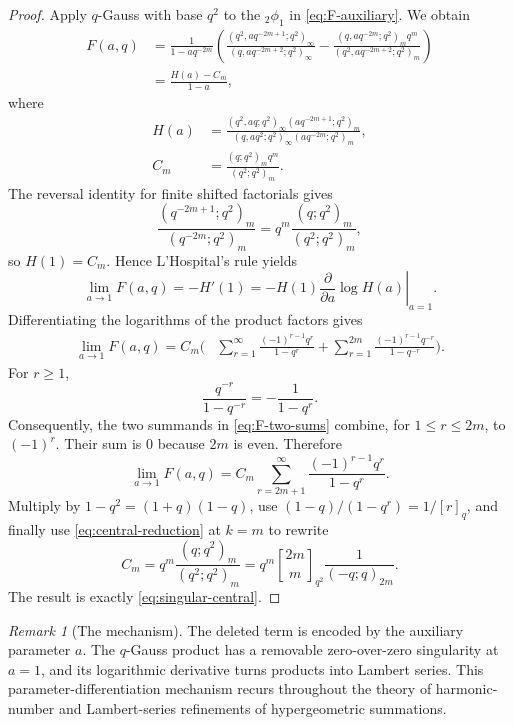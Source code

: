 \documentclass[11pt,oneside,openany]{book}
\theoremstyle{definition}
\theoremstyle{remark}
\newtheorem{remark}[remark]{Remark}
\newcommand{\Qbinom}[3]{\genfrac{[}{]}{0pt}{}{#1}{#2}_{#3}}
\begin{document}
\begin{proof}
Apply $q$-Gauss with base $q^2$ to the ${}_2\phi_1$ in \eqref{eq:F-auxiliary}.  We obtain
\begin{align*}
 F(a,q)
 &=\frac1{1-aq^{-2m}}
 \left(
 \frac{(q^2,aq^{-2m+1};q^2)_\infty}
 {(q,aq^{-2m+2};q^2)_\infty}
 -\frac{(q,aq^{-2m};q^2)_m q^m}
 {(q^2,aq^{-2m+2};q^2)_m}
 \right)\\
 &=\frac{H(a)-C_m}{1-a},
 \tag{18.10}\label{eq:F-H}
\end{align*}
where
\begin{align*}
 H(a)&=
 \frac{(q^2,aq;q^2)_\infty(aq^{-2m+1};q^2)_m}
 {(q,aq^2;q^2)_\infty(aq^{-2m};q^2)_m},\\
 C_m&=\frac{(q;q^2)_m q^m}{(q^2;q^2)_m}.
\end{align*}
The reversal identity for finite shifted factorials gives
\[
 \frac{(q^{-2m+1};q^2)_m}{(q^{-2m};q^2)_m}
 =q^m\frac{(q;q^2)_m}{(q^2;q^2)_m},
\]
so $H(1)=C_m$.  Hence L'Hospital's rule yields
\[
 \lim_{a\to1}F(a,q)=-H'(1)
 =-H(1)\left.\frac{\partial}{\partial a}\log H(a)\right|_{a=1}.
 \tag{18.11}\label{eq:F-logderivative}
\]
Differentiating the logarithms of the product factors gives
\begin{align*}
 \lim_{a\to1}F(a,q)
 =C_m\biggl(&
 \sum_{r=1}^{\infty}
 \frac{(-1)^{r-1}q^r}{1-q^r}
 +\sum_{r=1}^{2m}
 \frac{(-1)^{r-1}q^{-r}}{1-q^{-r}}
 \biggr).
 \tag{18.12}\label{eq:F-two-sums}
\end{align*}
For $r\ge1$,
\[
 \frac{q^{-r}}{1-q^{-r}}=-\frac1{1-q^r}.
\]
Consequently, the two summands in \eqref{eq:F-two-sums} combine, for $1\le r\le2m$, to $(-1)^r$.  Their sum is $0$ because $2m$ is even.  Therefore
\[
 \lim_{a\to1}F(a,q)
 =C_m\sum_{r=2m+1}^{\infty}
 \frac{(-1)^{r-1}q^r}{1-q^r}.
 \tag{18.13}\label{eq:F-tail}
\]
Multiply by $1-q^2=(1+q)(1-q)$, use
$(1-q)/(1-q^r)=1/[r]_q$, and finally use \eqref{eq:central-reduction} at $k=m$ to rewrite
\[
 C_m=q^m\frac{(q;q^2)_m}{(q^2;q^2)_m}
 =q^m\Qbinom{2m}{m}{q^2}\frac1{(-q;q)_{2m}}.
\]
The result is exactly \eqref{eq:singular-central}.
\end{proof}

\begin{remark}[The mechanism]
The deleted term is encoded by the auxiliary parameter $a$.  The $q$-Gauss product has a removable zero-over-zero singularity at $a=1$, and its logarithmic derivative turns products into Lambert series.  This parameter-differentiation mechanism recurs throughout the theory of harmonic-number and Lambert-series refinements of hypergeometric summations.
\end{remark}
\end{document}
